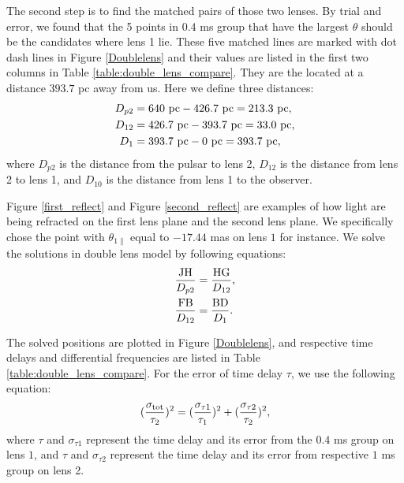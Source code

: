 \documentclass[useAMS,usenatbib]{mn2e}
\begin{document}
The second step is to find the matched pairs of those two lenses. By trial and error, we found that the 5 points in $0.4$ ms group that have the largest $\theta$ should be the candidates where lens 1 lie.  These five matched lines are marked with dot dash lines in Figure \ref{Doublelens} and their values are listed in the first two columns in Table \ref{table:double_lens_compare}. They are the located at a distance $393.7$ pc away from us. Here we define three distances:
\begin{align*}
D_{p2}&=640~{\rm pc}-426.7~{\rm pc} =213.3~{\rm pc},\\
D_{12}&=426.7~{\rm pc}-393.7~{\rm pc} =33.0~{\rm pc},\\
D_{1}&=393.7~{\rm pc}- 0~{\rm pc} = 393.7~{\rm pc}, 
\end{align*} 
where $D_{p2}$ is the distance from the pulsar to lens 2, $D_{12}$ is the distance from lens 2 to lens 1, and $D_{10}$ is the distance from lens 1 to the observer.

Figure \ref{first_reflect} and Figure \ref{second_reflect} are examples of how light are being refracted on the first lens plane and the second lens plane. We specifically chose the point with $\theta_{1\parallel}$ equal to $-17.44$ mas on lens $1$ for instance. We solve the solutions in double lens model by following equations:
\begin{align*}
\frac{\rm JH}{D_{p2}}&=\frac{\rm HG}{D_{12}},\\
\frac{\rm FB}{D_{12}}&=\frac{\rm BD}{D_{1}}.
\end{align*}

The solved positions are plotted in Figure \ref{Doublelens}, and respective time delays and differential frequencies are listed in Table \ref{table:double_lens_compare}. For the error of time delay $\tau$, we use the following equation: 
\begin{align*}
(\frac{\sigma_{\rm tot}}{\tau_2})^2 = (\frac{\sigma_{\tau1}}{\tau_1})^2+(\frac{\sigma_{\tau2}}{\tau_2})^2,
\end{align*}
where $\tau$ and $\sigma_{\tau1}$ represent the time delay and its error from the $0.4$ ms group on lens $1$, and $\tau$ and $\sigma_{\tau2}$ represent the time delay and its error from respective $1$ ms group on lens 2.
\end{document}
